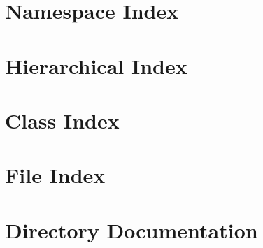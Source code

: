 \documentclass[twoside]{book}
\newcommand{\+}{\discretionary{\mbox{\scriptsize$\hookleftarrow$}}{}{}}
\begin{document}
\chapter{Namespace Index}

\chapter{Hierarchical Index}

\chapter{Class Index}

\chapter{File Index}

\chapter{Directory Documentation}




































\end{document}
